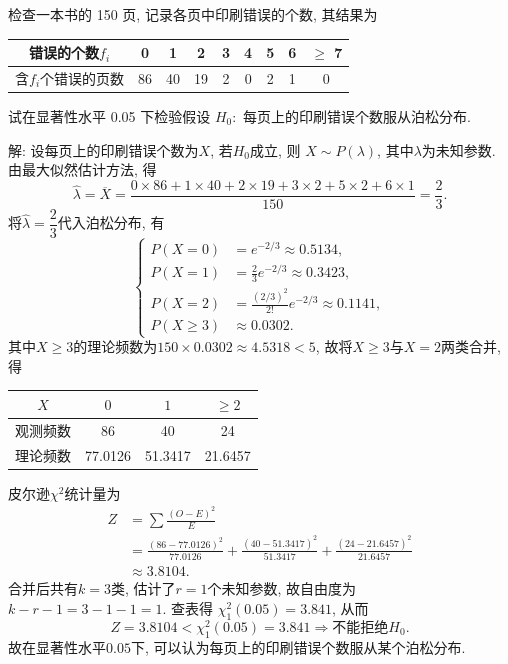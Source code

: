\documentclass[standard]{ExBook}
\renewenvironment{shaded}{%
  \def\FrameCommand{\fboxsep=\FrameSep \colorbox{shadecolor}}%
  \MakeFramed{\advance\hsize-\width \FrameRestore}%
}{%
  \endMakeFramed
}
\begin{document}
\begin{qitems}
    \begin{bbox}
    \begin{shaded}
        \qitem
检查一本书的 150 页, 记录各页中印刷错误的个数, 其结果为
\begin{center}
\setlength{\tabcolsep}{16pt}
\begin{tabular}{c|cccccccc}
\hline
错误的个数$f_i$ & 0 & 1 & 2 & 3 & 4 & 5 & 6 & $\geq$ 7 \\
\hline
含$f_i$个错误的页数 & 86 & 40 & 19 & 2 & 0 & 2 & 1 & 0 \\
\hline
\end{tabular}
\end{center}
试在显著性水平 0.05 下检验假设 $H_0 : $ 每页上的印刷错误个数服从泊松分布.
    \end{shaded}
    \end{bbox}

\vspace{\dimexpr2.5cm-5em\relax}

解: 设每页上的印刷错误个数为$X$, 若$H_0$成立, 则
$
X\sim P(\lambda)
$,
其中$\lambda$为未知参数. 由最大似然估计方法, 得
$$
\hat{\lambda}
=\overline{X}
=\frac{0\times86+1\times40+2\times19+3\times2+5\times2+6\times1}{150}
=\frac{2}{3}.
$$
将$\hat{\lambda}=\dfrac{2}{3}$代入泊松分布, 有
$$
\left\{
\begin{aligned}
P(X=0)&=e^{-2/3}\approx0.5134,\\
P(X=1)&=\frac{2}{3}e^{-2/3}\approx0.3423,\\
P(X=2)&=\frac{(2/3)^2}{2!}e^{-2/3}\approx0.1141,\\
P(X\geq3)&\approx0.0302.
\end{aligned}
\right.
$$
其中$X\geq3$的理论频数为$150\times0.0302\approx4.5318<5$, 故将$X\geq3$与$X=2$两类合并, 得
\begin{center}
\setlength{\tabcolsep}{32pt}
\begin{tabular}{c|ccc}
\hline
$X$ & $0$ & $1$ & $\geq2$\\
\hline
观测频数 & 86 & 40 & 24\\
理论频数 & 77.0126 & 51.3417 & 21.6457\\
\hline
\end{tabular}
\end{center}
皮尔逊$\chi^2$统计量为
$$
\begin{aligned}
Z
&=\sum\frac{(O-E)^2}{E}\\
&=\frac{(86-77.0126)^2}{77.0126}
+\frac{(40-51.3417)^2}{51.3417}
+\frac{(24-21.6457)^2}{21.6457}\\
&\approx3.8104.
\end{aligned}
$$
合并后共有$k=3$类, 估计了$r=1$个未知参数, 故自由度为
$
k-r-1=3-1-1=1
$.
查表得
$
\chi_1^2(0.05)=3.841
$,
从而
$$
Z=3.8104<\chi_1^2(0.05)=3.841
\Longrightarrow
\text{不能拒绝}H_0.
$$
故在显著性水平$0.05$下, 可以认为每页上的印刷错误个数服从某个泊松分布.


\end{qitems}
\end{document}
